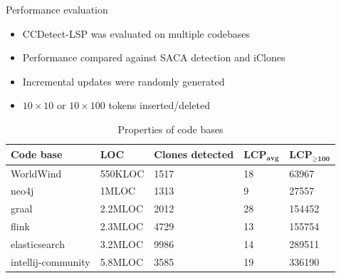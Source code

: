 \documentclass[aspectratio=1610, xcolor=table]{beamer}
\begin{document}
\begin{frame}{Performance evaluation}
    \begin{itemize}
        \item CCDetect-LSP was evaluated on multiple codebases
        \item Performance compared against SACA detection and iClones
        \item Incremental updates were randomly generated
        \item $10 \times 10$ or $10 \times 100$ tokens inserted/deleted
    \end{itemize}
    \begin{table}[t]
    \begin{center}
        \begin{tabular}[c]{|l|l|l|l|l|}
            \hline
            \textbf{Code base} & \textbf{LOC} & \textbf{Clones detected} &
            $\textbf{LCP}_{\textbf{avg}}$ & $\textbf{LCP}_{\geq \textbf{100}}$ \\
            \hline
            WorldWind & 550KLOC & 1517 & 18 & 63967\\
            \hline
            neo4j & 1MLOC & 1313 & 9 & 27557\\
            \hline
            graal & 2.2MLOC & 2012 & 28 & 154452\\
            \hline
            flink & 2.3MLOC & 4729 & 13 & 155754\\
            \hline
            elasticsearch & 3.2MLOC & 9986 & 14 & 289511 \\
            \hline
            intellij-community & 5.8MLOC & 3585 & 19 & 336190 \\
            \hline
        \end{tabular}
    \end{center}
    \caption{Properties of code bases}
    \label{tab:codebases}
\end{table}

\end{frame}
\end{document}
